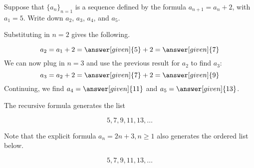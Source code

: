 \documentclass{ximera}
\begin{document}
\begin{example}
 Suppose that $\{a_n\}_{n=1}$ is a sequence defined by the formula $a_{n+1} = a_n+2$, with $a_1 = 5$.  Write down $a_2$, $a_3$, $a_4$, and $a_5$.  
 
\begin{explanation}
 Substituting in $n=2$ gives the following.
 
 \[
 a_2 = a_{1}+2 = \answer[given]{5}+2 = \answer[given]{7}
 \]
 We can now plug in $n=3$ and use the previous result for $a_2$ to find $a_3$:
  \[
 a_3 = a_{2}+2 = \answer[given]{7}+2 = \answer[given]{9}
 \]
 Continuing, we find $a_4 = \answer[given]{11}$ and $a_5 = \answer[given]{13}$.

\end{explanation}


The recursive formula generates the list 

\[
5,7,9,11,13, \dots
\]   




Note that the explicit formula $a_{n} = 2n + 3, n \geq 1$ also generates the ordered list below.

\[
5,7,9,11,13, \dots
\]   



\end{example}
\end{document}
